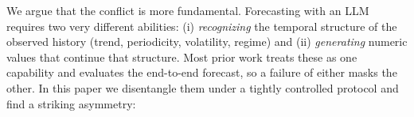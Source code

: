 \documentclass{article}
\begin{document}
We argue that the conflict is more fundamental.  Forecasting with an LLM
requires two very different abilities: (i) \emph{recognizing} the temporal
structure of the observed history (trend, periodicity, volatility, regime) and
(ii) \emph{generating} numeric values that continue that structure.  Most
prior work treats these as one capability and evaluates the end-to-end
forecast, so a failure of either masks the other.  In this paper we
disentangle them under a tightly controlled protocol and find a striking
asymmetry:

\begin{center}
\end{center}
\end{document}
